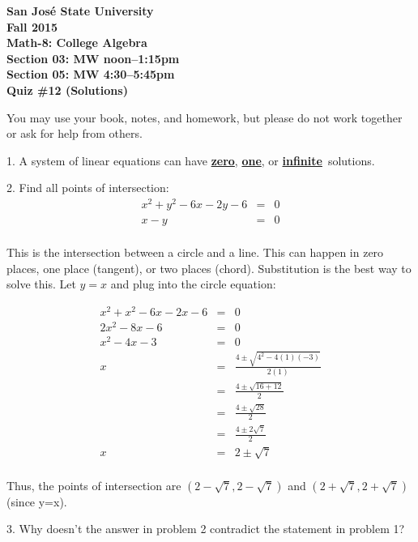 \documentclass[letterpaper, 12pt]{article}
\begin{document}
\begin{center}
\bfseries
San Jos\'{e} State University \\
Fall 2015 \\
Math-8: College Algebra \\
Section 03: MW noon--1:15pm \\
Section 05: MW 4:30--5:45pm \\
\bigskip
Quiz \#12 (Solutions)
\end{center}

\bigskip

You may use your book, notes, and homework, but please do not work together or
ask for help from others.

\bigskip

\newcommand{\answer}[1]{\textbf{\underline{#1}}}

1. A system of linear equations can have \answer{zero}, \answer{one}, or
\answer{infinite}\ solutions.

\bigskip

2. Find all points of intersection:
\begin{eqnarray*}
x^2+y^2-6x-2y-6 &=& 0 \\
x-y &=& 0 \\
\end{eqnarray*}

This is the intersection between a circle and a line. This can happen in zero
places, one place (tangent), or two places (chord). Substitution is the best
way to solve this. Let $y=x$ and plug into the circle equation:

\begin{eqnarray*}
x^2+x^2-6x-2x-6 &=& 0 \\
2x^2-8x-6 &=& 0 \\
x^2-4x-3 &=& 0 \\
x &=& \frac{4\pm\sqrt{4^2-4(1)(-3)}}{2(1)} \\
  &=& \frac{4\pm\sqrt{16+12}}{2} \\
  &=& \frac{4\pm\sqrt{28}}{2} \\
  &=& \frac{4\pm2\sqrt{7}}{2} \\
x &=& 2\pm\sqrt{7} \\
\end{eqnarray*}

Thus, the points of intersection are $(2-\sqrt{7},2-\sqrt{7})$ and
$(2+\sqrt{7},2+\sqrt{7})$ (since y=x).

\bigskip

3. Why doesn't the answer in problem 2 contradict the statement in problem 1?
\end{document}

